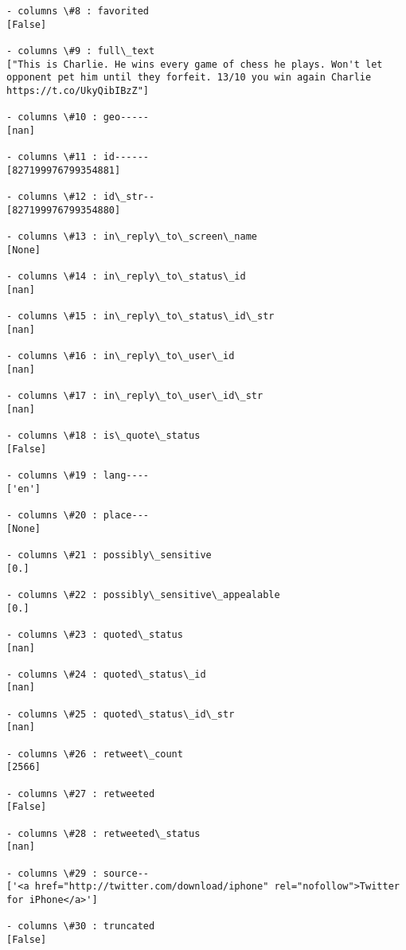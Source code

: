 \documentclass[11pt]{article}
\begin{document}
\begin{Verbatim}[commandchars=\\\{\}]
- columns \#8 : favorited
[False]

- columns \#9 : full\_text
["This is Charlie. He wins every game of chess he plays. Won't let opponent pet him until they forfeit. 13/10 you win again Charlie https://t.co/UkyQibIBzZ"]

- columns \#10 : geo-----
[nan]

- columns \#11 : id------
[827199976799354881]

- columns \#12 : id\_str--
[827199976799354880]

- columns \#13 : in\_reply\_to\_screen\_name
[None]

- columns \#14 : in\_reply\_to\_status\_id
[nan]

- columns \#15 : in\_reply\_to\_status\_id\_str
[nan]

- columns \#16 : in\_reply\_to\_user\_id
[nan]

- columns \#17 : in\_reply\_to\_user\_id\_str
[nan]

- columns \#18 : is\_quote\_status
[False]

- columns \#19 : lang----
['en']

- columns \#20 : place---
[None]

- columns \#21 : possibly\_sensitive
[0.]

- columns \#22 : possibly\_sensitive\_appealable
[0.]

- columns \#23 : quoted\_status
[nan]

- columns \#24 : quoted\_status\_id
[nan]

- columns \#25 : quoted\_status\_id\_str
[nan]

- columns \#26 : retweet\_count
[2566]

- columns \#27 : retweeted
[False]

- columns \#28 : retweeted\_status
[nan]

- columns \#29 : source--
['<a href="http://twitter.com/download/iphone" rel="nofollow">Twitter for iPhone</a>']

- columns \#30 : truncated
[False]


\end{Verbatim}
\end{document}
